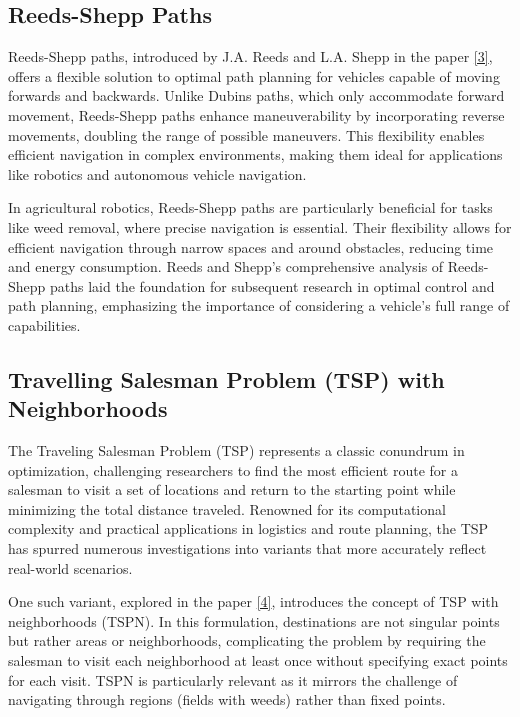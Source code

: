 \subsection{Reeds-Shepp Paths}

Reeds-Shepp paths, introduced by J.A. Reeds and L.A. Shepp in the paper \hyperlink{cite.reeds}{[3]}, offers a flexible solution to optimal path planning for vehicles capable of moving forwards and backwards. Unlike Dubins paths, which only accommodate forward movement, Reeds-Shepp paths enhance maneuverability by incorporating reverse movements, doubling the range of possible maneuvers. This flexibility enables efficient navigation in complex environments, making them ideal for applications like robotics and autonomous vehicle navigation.

\vspace{3mm}

In agricultural robotics, Reeds-Shepp paths are particularly beneficial for tasks like weed removal, where precise navigation is essential. Their flexibility allows for efficient navigation through narrow spaces and around obstacles, reducing time and energy consumption. Reeds and Shepp's comprehensive analysis of Reeds-Shepp paths laid the foundation for subsequent research in optimal control and path planning, emphasizing the importance of considering a vehicle's full range of capabilities.





\subsection{Travelling Salesman Problem (TSP) with Neighborhoods} 

The Traveling Salesman Problem (TSP) represents a classic conundrum in optimization, challenging researchers to find the most efficient route for a salesman to visit a set of locations and return to the starting point while minimizing the total distance traveled. Renowned for its computational complexity and practical applications in logistics and route planning, the TSP has spurred numerous investigations into variants that more accurately reflect real-world scenarios.

\vspace{3mm}

One such variant, explored in the paper \hyperlink{cite.TSPN}{[4]}, introduces the concept of TSP with neighborhoods (TSPN). In this formulation, destinations are not singular points but rather areas or neighborhoods, complicating the problem by requiring the salesman to visit each neighborhood at least once without specifying exact points for each visit. TSPN is particularly relevant as it mirrors the challenge of navigating through regions (fields with weeds) rather than fixed points.

